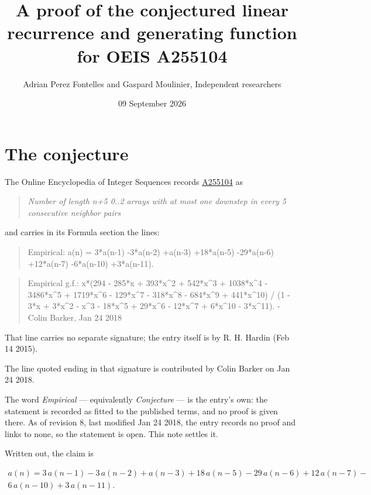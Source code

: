 \documentclass[11pt]{article}
\title{A proof of the conjectured linear recurrence and generating function for OEIS A255104}
\author{Adrian Perez Fontelles and Gaspard Moulinier, Independent researchers}
\date{09 September 2026}
\theoremstyle{definition}
\begin{document}
\maketitle
\section{The conjecture}

The Online Encyclopedia of Integer Sequences records \href{https://oeis.org/A255104}{A255104} as

\begin{quote}\itshape Number of length n+5 0..2 arrays with at most one downstep in every 5 consecutive neighbor pairs\end{quote}

and carries in its Formula section the lines:

\begin{quote}\ttfamily Empirical: a(n) = 3*a(n-1) -3*a(n-2) +a(n-3) +18*a(n-5) -29*a(n-6) +12*a(n-7) -6*a(n-10) +3*a(n-11).\end{quote}

\begin{quote}\ttfamily Empirical g.f.: x*(294 - 285*x + 393*x\textasciicircum{}2 + 542*x\textasciicircum{}3 + 1038*x\textasciicircum{}4 - 3486*x\textasciicircum{}5 + 1719*x\textasciicircum{}6 - 129*x\textasciicircum{}7 - 318*x\textasciicircum{}8 - 684*x\textasciicircum{}9 + 441*x\textasciicircum{}10) / (1 - 3*x + 3*x\textasciicircum{}2 - x\textasciicircum{}3 - 18*x\textasciicircum{}5 + 29*x\textasciicircum{}6 - 12*x\textasciicircum{}7 + 6*x\textasciicircum{}10 - 3*x\textasciicircum{}11). - Colin Barker, Jan 24 2018\end{quote}

That line carries no separate signature; the entry itself is by R. H. Hardin (Feb 14 2015).

The line quoted ending in that signature is contributed by Colin Barker on Jan 24 2018.

The word {\itshape Empirical} --- equivalently {\itshape Conjecture} --- is the entry's own: the statement is recorded as fitted to the published terms, and no proof is given there. As of revision 8, last modified Jan 24 2018, the entry records no proof and links to none, so the statement is open. This note settles it.

Written out, the claim is

\begin{multline*} a(n) = 3\,a(n-1) - 3\,a(n-2) + a(n-3) + 18\,a(n-5) - 29\,a(n-6) + 12\,a(n-7) - \\ 6\,a(n-10) + 3\,a(n-11). \end{multline*}
\end{document}
